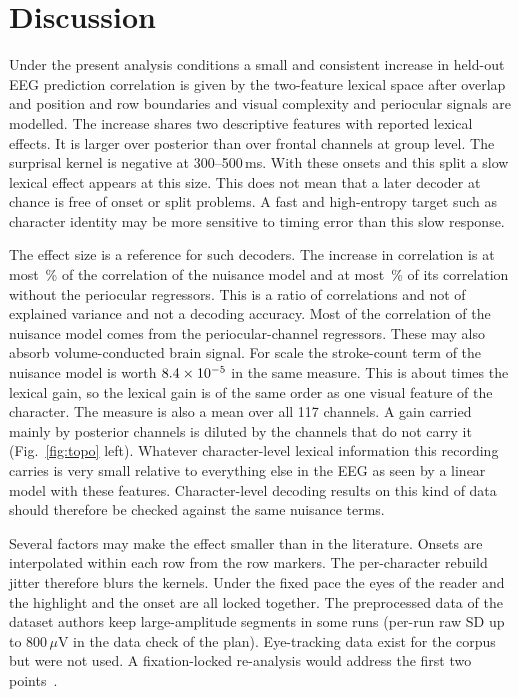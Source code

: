 \documentclass[sigconf]{acmart}
\newcommand{\tenm}[1]{#1\times10^{-5}}
\begin{document}
\section{Discussion}
Under the present analysis conditions a small and consistent increase in held-out EEG prediction correlation is given by the two-feature lexical space after overlap and position and row boundaries and visual complexity and periocular signals are modelled. The increase shares two descriptive features with reported lexical effects. It is larger over posterior than over frontal channels at group level. The surprisal kernel is negative at 300--500\,ms. With these onsets and this split a slow lexical effect appears at this size. This does not mean that a later decoder at chance is free of onset or split problems. A fast and high-entropy target such as character identity may be more sensitive to timing error than this slow response.

The effect size is a reference for such decoders. The increase in correlation is at most \pctNmax\,\% of the correlation of the nuisance model and at most \pctNeyemax\,\% of its correlation without the periocular regressors. This is a ratio of correlations and not of explained variance and not a decoding accuracy. Most of the correlation of the nuisance model comes from the periocular-channel regressors. These may also absorb volume-conducted brain signal. For scale the stroke-count term of the nuisance model is worth $\tenm{\strokesMean}$ in the same measure. This is about \strokesOverLex{} times the lexical gain, so the lexical gain is of the same order as one visual feature of the character. The measure is also a mean over all 117 channels. A gain carried mainly by posterior channels is diluted by the channels that do not carry it (Fig.~\ref{fig:topo} left). Whatever character-level lexical information this recording carries is very small relative to everything else in the EEG as seen by a linear model with these features. Character-level decoding results on this kind of data should therefore be checked against the same nuisance terms.

Several factors may make the effect smaller than in the literature. Onsets are interpolated within each row from the row markers. The per-character rebuild jitter therefore blurs the kernels. Under the fixed pace the eyes of the reader and the highlight and the onset are all locked together. The preprocessed data of the dataset authors keep large-amplitude segments in some runs (per-run raw SD up to 800\,$\mu$V in the data check of the plan). Eye-tracking data exist for the corpus but were not used. A fixation-locked re-analysis would address the first two points~\cite{dimigen2021regression}.
\end{document}
